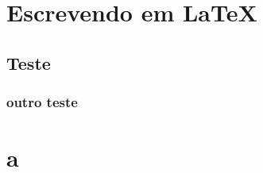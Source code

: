 \chapter{Escrevendo em \LaTeX}

\lipsum

\section{Teste}

\lipsum

\subsection{outro teste}

\lipsum

\chapter{a}
